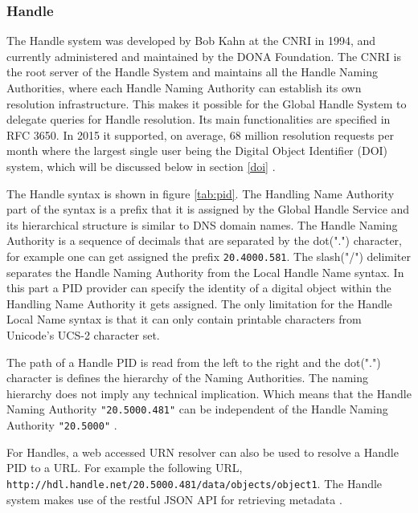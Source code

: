 \subsubsection{Handle}
The Handle system was developed by Bob Kahn at the CNRI in 1994, and currently administered and maintained by the DONA Foundation. The CNRI is the root server of the Handle System and maintains all the Handle Naming Authorities, where each Handle Naming Authority can establish its own resolution infrastructure. This makes it possible for the Global Handle System to delegate queries for Handle resolution. 
Its main functionalities are specified in RFC 3650. In 2015 it supported, on average, 68 million resolution requests per month where the largest single user being the Digital Object Identifier (DOI) system, which will be discussed below in section \ref{doi} \cite{hdl-us}. 

The Handle syntax is shown in figure \ref{tab:pid}. The Handling Name Authority part of the syntax is a prefix that it is assigned by the Global Handle
Service and its hierarchical structure is similar to DNS domain names. The Handle Naming Authority is a sequence of decimals that are separated by the
dot(".") character, for example one can get assigned the prefix \texttt{20.4000.581}. 
The slash("/") delimiter separates the Handle Naming Authority from the Local Handle Name syntax. In this part a PID provider can specify the identity of a digital object within the Handling Name Authority it gets assigned. 
The only limitation for the Handle Local Name syntax is that it can only contain printable characters from Unicode's
UCS-2 character set.

The path of a Handle PID is read from the left to the right and the dot(".") character is defines the hierarchy of the Naming Authorities. The naming hierarchy
does not imply any technical implication. Which means that the Handle Naming Authority \texttt{"20.5000.481"} can be independent of the Handle Naming Authority \texttt{"20.5000"} \cite{icn-bd}.

For Handles, a web accessed URN resolver can also be used to resolve a Handle PID to a URL. For example the following URL, \texttt{http://hdl.handle.net/20.5000.481/data/objects/object1}. The Handle system makes use of the restful JSON API for retrieving metadata \cite{hdl-api}.


